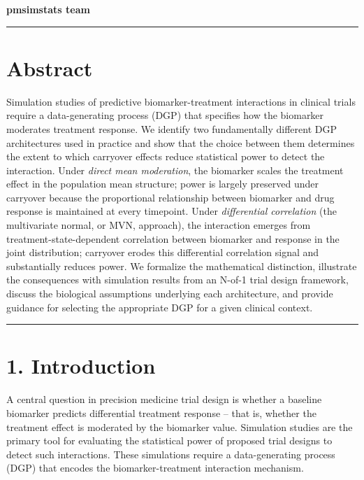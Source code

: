 \documentclass[11pt]{article}
\begin{document}
\maketitle
\thispagestyle{fancy}
\tableofcontents

\bigskip

\textbf{pmsimstats team}

\bigskip\noindent\rule{\textwidth}{0.4pt}\bigskip

\section{Abstract}

Simulation studies of predictive biomarker-treatment interactions
in clinical trials require a data-generating process (DGP) that
specifies how the biomarker moderates treatment response. We
identify two fundamentally different DGP architectures used in
practice and show that the choice between them determines the
extent to which carryover effects reduce statistical power to
detect the interaction. Under \textit{direct mean moderation}, the
biomarker scales the treatment effect in the population mean
structure; power is largely preserved under carryover because the
proportional relationship between biomarker and drug response is
maintained at every timepoint. Under \textit{differential
correlation} (the multivariate normal, or MVN, approach), the interaction emerges from treatment-state-dependent
correlation between biomarker and response in the joint
distribution; carryover erodes this differential correlation signal
and substantially reduces power. We formalize the mathematical
distinction, illustrate the consequences with simulation results
from an N-of-1 trial design framework, discuss the biological
assumptions underlying each architecture, and provide guidance for
selecting the appropriate DGP for a given clinical context.

\bigskip\noindent\rule{\textwidth}{0.4pt}\bigskip

\section{1. Introduction}

A central question in precision medicine trial design is whether a
baseline biomarker predicts differential treatment response -- that
is, whether the treatment effect is moderated by the biomarker
value. Simulation studies are the primary tool for evaluating the
statistical power of proposed trial designs to detect such
interactions. These simulations require a data-generating process
(DGP) that encodes the biomarker-treatment interaction mechanism.
\end{document}
